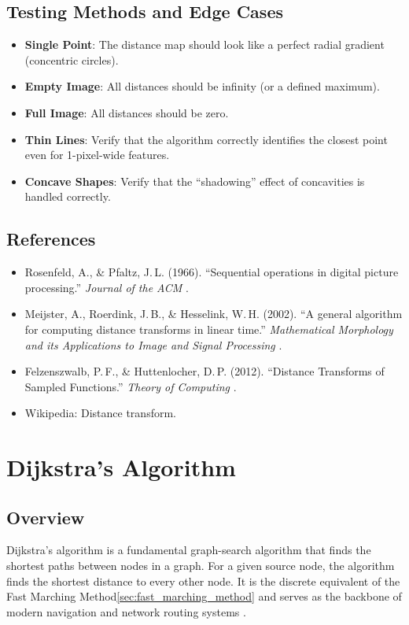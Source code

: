 \subsection{Testing Methods and Edge Cases}
\begin{itemize}
  \item \textbf{Single Point}: The distance map should look like a perfect radial gradient (concentric circles).
  \item \textbf{Empty Image}: All distances should be infinity (or a defined maximum).
  \item \textbf{Full Image}: All distances should be zero.
  \item \textbf{Thin Lines}: Verify that the algorithm correctly identifies the closest point even for 1-pixel-wide features.
  \item \textbf{Concave Shapes}: Verify that the ``shadowing'' effect of concavities is handled correctly.
\end{itemize}

\subsection{References}
\begin{itemize}
  \item Rosenfeld, A., \& Pfaltz, J.\,L. (1966). ``Sequential operations in digital picture processing.'' \textit{Journal of the ACM} \cite{rosenfeld1966}.
  \item Meijster, A., Roerdink, J.\,B., \& Hesselink, W.\,H. (2002). ``A general algorithm for computing distance transforms in linear time.'' \textit{Mathematical Morphology and its Applications to Image and Signal Processing} \cite{meijster2002}.
  \item Felzenszwalb, P.\,F., \& Huttenlocher, D.\,P. (2012). ``Distance Transforms of Sampled Functions.'' \textit{Theory of Computing} \cite{felzenszwalb2012}.
  \item Wikipedia: Distance transform.
\end{itemize}

\section{Dijkstra's Algorithm}
\label{sec:dijkstra}

\subsection{Overview}
Dijkstra's algorithm is a fundamental graph-search algorithm that finds the shortest paths between nodes in a graph. For a given source node, the algorithm finds the shortest distance to every other node. It is the discrete equivalent of the Fast Marching Method\cref{sec:fast_marching_method} and serves as the backbone of modern navigation and network routing systems \cite{dijkstra1959}.

